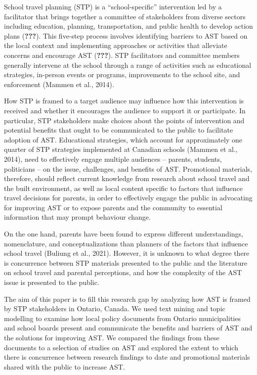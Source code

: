 \documentclass[]{elsarticle} %
\begin{document}
School travel planning (STP) is a ``school-specific'' intervention led
by a facilitator that brings together a committee of stakeholders from
diverse sectors including education, planning, transportation, and
public health to develop action plans ({\textbf{???}}). This five-step
process involves identifying barriers to AST based on the local context
and implementing approaches or activities that alleviate concerns and
encourage AST ({\textbf{???}}). STP facilitators and committee members
generally intervene at the school through a range of activities such as
educational strategies, in-person events or programs, improvements to
the school site, and enforcement (Mammen et al., 2014).

How STP is framed to a target audience may influence how this
intervention is received and whether it encourages the audience to
support it or participate. In particular, STP stakeholders make choices
about the points of intervention and potential benefits that ought to be
communicated to the public to facilitate adoption of AST. Educational
strategies, which account for approximately one quarter of STP
strategies implemented at Canadian schools (Mammen et al., 2014), need
to effectively engage multiple audiences -- parents, students,
politicians -- on the issue, challenges, and benefits of AST.
Promotional materials, therefore, should reflect current knowledge from
research about school travel and the built environment, as well as local
content specific to factors that influence travel decisions for parents,
in order to effectively engage the public in advocating for improving
AST or to expose parents and the community to essential information that
may prompt behaviour change.

On the one hand, parents have been found to express different
understandings, nomenclature, and conceptualizations than planners of
the factors that influence school travel (Buliung et al., 2021).
However, it is unknown to what degree there is concurrence between STP
materials presented to the public and the literature on school travel
and parental perceptions, and how the complexity of the AST issue is
presented to the public.

The aim of this paper is to fill this research gap by analyzing how AST
is framed by STP stakeholders in Ontario, Canada. We used text mining
and topic modelling to examine how local policy documents from Ontario
municipalities and school boards present and communicate the benefits
and barriers of AST and the solutions for improving AST. We compared the
findings from these documents to a selection of studies on AST and
explored the extent to which there is concurrence between research
findings to date and promotional materials shared with the public to
increase AST.
\end{document}
